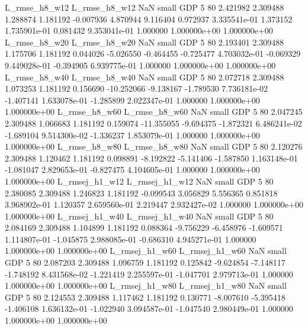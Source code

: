  L_rmse_h8_w12  L_rmse_h8_w12                   NaN      small      GDP                 5 80 2.421982       2.309488 1.288874       1.181192   -0.007936      4.870944      9.116404     0.972937   3.335541e-01  1.373152 1.735901e-01     0.081432   9.353041e-01            1.000000    1.000000e+00        1.000000e+00
 L_rmse_h8_w20  L_rmse_h8_w20                   NaN      small      GDP                 5 80 2.193401       2.309488 1.175706       1.181192    0.044026     -5.026550     -0.464455    -0.725477   4.703032e-01 -0.069329 9.449028e-01    -0.394905   6.939775e-01            1.000000    1.000000e+00        1.000000e+00
 L_rmse_h8_w40  L_rmse_h8_w40                   NaN      small      GDP                 5 80 2.072718       2.309488 1.073253       1.181192    0.156690    -10.252066     -9.138167    -1.789530   7.736181e-02 -1.407141 1.633078e-01    -1.285899   2.022347e-01            1.000000    1.000000e+00        1.000000e+00
 L_rmse_h8_w60  L_rmse_h8_w60                   NaN      small      GDP                 5 80 2.047245       2.309488 1.066683       1.181192    0.159074    -11.355055     -9.694375    -1.872321   6.486241e-02 -1.689104 9.514300e-02    -1.336237   1.853079e-01            1.000000    1.000000e+00        1.000000e+00
 L_rmse_h8_w80  L_rmse_h8_w80                   NaN      small      GDP                 5 80 2.120276       2.309488 1.120462       1.181192    0.098891     -8.192822     -5.141406    -1.587850   1.163148e-01 -1.081047 2.829653e-01    -0.827475   4.104605e-01            1.000000    1.000000e+00        1.000000e+00
L_rmsej_h1_w12 L_rmsej_h1_w12                   NaN      small      GDP                 5 80 2.380085       2.309488 1.246823       1.181192   -0.099543      3.056829      5.556365     0.851818   3.968902e-01  1.120357 2.659560e-01     2.219447   2.932427e-02            1.000000    1.000000e+00        1.000000e+00
L_rmsej_h1_w40 L_rmsej_h1_w40                   NaN      small      GDP                 5 80 2.084169       2.309488 1.104899       1.181192    0.088364     -9.756229     -6.458976    -1.609571   1.114807e-01 -1.045875 2.988085e-01    -0.686310   4.945271e-01            1.000000    1.000000e+00        1.000000e+00
L_rmsej_h1_w60 L_rmsej_h1_w60                   NaN      small      GDP                 5 80 2.087203       2.309488 1.096759       1.181192    0.125842     -9.624854     -7.148117    -1.748192   8.431568e-02 -1.221419 2.255597e-01    -1.047701   2.979713e-01            1.000000    1.000000e+00        1.000000e+00
L_rmsej_h1_w80 L_rmsej_h1_w80                   NaN      small      GDP                 5 80 2.124553       2.309488 1.117462       1.181192    0.130771     -8.007610     -5.395418    -1.406108   1.636132e-01 -1.022940 3.094587e-01    -1.047540   2.980449e-01            1.000000    1.000000e+00        1.000000e+00
